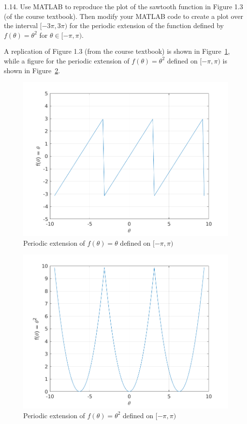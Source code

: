 \documentclass{article}
\begin{document}
\newpage

1.14. Use MATLAB to reproduce the plot of the sawtooth function in
  Figure 1.3 (of the course textbook). Then modify your MATLAB code to
  create a plot over the interval $[-3 \pi, 3 \pi)$ for the periodic
  extension of the function defined by $f(\theta) = \theta^2$ for
  $\theta \in [-\pi, \pi)$.

A replication of Figure 1.3 (from the course textbook) is shown in
Figure~\ref{fig:1-14-a}, while a figure for the periodic extension of
$f(\theta) = \theta^2$ defined on $[-\pi, \pi)$ is shown in
Figure~\ref{fig:1-14-b}.
%
\begin{figure}[ht]
    \includegraphics[width=35em]{q114a}
    \centering
    \caption{Periodic extension of $f(\theta) = \theta$ defined on $[-\pi, \pi)$}
    \label{fig:1-14-a}
\end{figure}

\begin{figure}
    \includegraphics[width=35em]{q114b}
    \centering
    \caption{Periodic extension of $f(\theta) = \theta^2$ defined on $[-\pi, \pi)$}
    \label{fig:1-14-b}
\end{figure}
\end{document}
